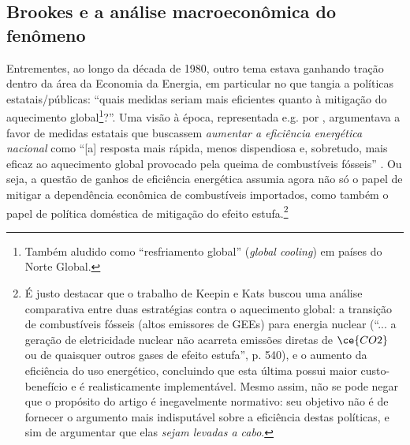 \subsection{Brookes e a análise macroeconômica do fenômeno}
\label{secao_brookes}
Entrementes, ao longo da década de 1980, outro tema estava ganhando tração dentro da área da Economia da Energia, em particular no que tangia a políticas estatais/públicas: ``quais medidas seriam mais eficientes quanto à mitigação do aquecimento global\footnote{Também aludido como ``resfriamento global'' (\textit{global cooling}) em países do Norte Global.}?''. Uma visão à época, representada e.g. por \textcite{Keepin1988,Keepin1989}, argumentava a favor de medidas estatais que buscassem \textit{aumentar a eficiência energética nacional} como ``[a] resposta mais rápida, menos dispendiosa e, sobretudo, mais eficaz ao aquecimento global provocado pela queima de combustíveis fósseis'' \parencite[p. 554]{Keepin1988}. Ou seja, a questão de ganhos de eficiência energética assumia agora não só o papel de mitigar a dependência econômica de combustíveis importados, como também o papel de política doméstica de mitigação do efeito estufa.\footnote{É justo destacar que o trabalho de Keepin e Kats \parencite{Keepin1988} buscou uma análise comparativa entre duas estratégias contra o aquecimento global: a transição de combustíveis fósseis (altos emissores de GEEs) para energia nuclear (``... a geração de eletricidade nuclear não acarreta emissões diretas de $\ce{CO2}$ ou de quaisquer outros gases de efeito estufa'', p. 540), e o aumento da eficiência do uso energético, concluindo que esta última possui maior custo-benefício e é realisticamente implementável. Mesmo assim, não se pode negar que o propósito do artigo é inegavelmente normativo: seu objetivo não é de fornecer o argumento mais indisputável sobre a eficiência destas políticas, e sim de argumentar que elas \textit{sejam levadas a cabo}.}

